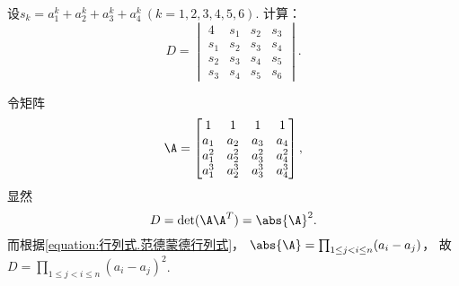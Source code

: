 \begin{example}
设\(s_k = a_1^k + a_2^k + a_3^k + a_4^k\ (k=1,2,3,4,5,6)\).
计算：\[
	D = \begin{vmatrix}
		4 & s_1 & s_2 & s_3 \\
		s_1 & s_2 & s_3 & s_4 \\
		s_2 & s_3 & s_4 & s_5 \\
		s_3 & s_4 & s_5 & s_6
	\end{vmatrix}.
\]
\begin{solution}
令矩阵\[
	\A = \begin{bmatrix}
		1 & 1 & 1 & 1 \\
		a_1 & a_2 & a_3 & a_4 \\
		a_1^2 & a_2^2 & a_3^2 & a_4^2 \\
		a_1^3 & a_2^3 & a_3^3 & a_4^3
	\end{bmatrix},
\]
显然\[
	D = \det(\A \A^T) = \abs{\A}^2.
\]
而根据\cref{equation:行列式.范德蒙德行列式}，
\(\abs{\A}
= \prod_{1 \leq j < i \leq n} (a_i - a_j)\)，
故\(D = \prod_{1 \leq j < i \leq n} (a_i - a_j)^2\).
\end{solution}
\end{example}
